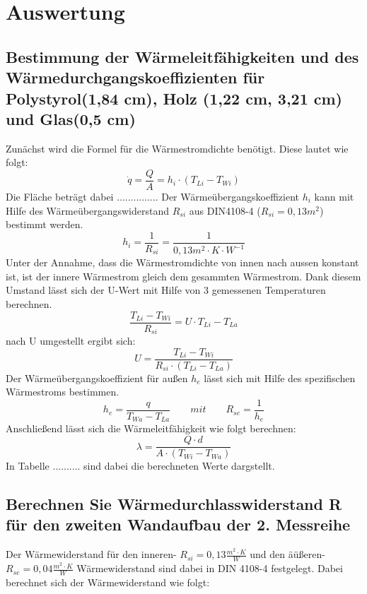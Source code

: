 \section{Auswertung}
\subsection{Bestimmung der Wärmeleitfähigkeiten und des Wärmedurchgangskoeffizienten für Polystyrol(1,84 cm), Holz (1,22 cm, 3,21 cm) und  Glas(0,5 cm)}
Zunächst wird die Formel für die Wärmestromdichte benötigt. Diese lautet wie folgt:
\begin{equation}
\dot q=\frac{ Q }{ A }=h_{ i }\cdot(T_{ Li }-T_{Wi })
  \label{eq:230514_Wärmestromdichte}
\end{equation}
Die Fläche beträgt dabei ............... Der Wärmeübergangskoeffizient $h_{i}$ kann mit Hilfe des Wärmeübergangswiderstand $R_{si}$ aus DIN4108-4 ($R_{si}=0,13 m^2$) bestimmt werden.
\begin{equation}
h_{i}=\frac{ 1 }{ R_{ si } }=\frac{ 1 }{ 0,13m^2\cdot K \cdot W^{-1} }
  \label{eq:230514_Wärmeübergangskoeffizient}
\end{equation}
Unter der Annahme, dass die Wärmestromdichte von innen nach aussen konstant ist, ist der innere Wärmestrom gleich dem gesammten Wärmestrom. Dank diesem Umstand lässt sich der U-Wert mit Hilfe von 3 gemessenen Temperaturen berechnen.
\begin{equation}
\frac{ T_{Li} - T_{Wi}}{ R_{ si } }=U \cdot T_{Li} - T_{La}
  \label{eq:230514_u1}
\end{equation}
nach U umgestellt ergibt sich: 
\begin{equation}
U = \frac{ T_{Li} - T_{Wi}}{ R_{ si } \cdot  (T_{Li} - T_{La})}
  \label{eq:230514_u2}
\end{equation}
Der Wärmeübergangskoeffizient für außen $h_{e}$ lässt sich mit Hilfe des spezifischen Wärmestroms bestimmen. 
\begin{equation}
h_{e}=\frac{ q }{ T_{Wa} - T_{La} }   \qquad  mit     \qquad       R_{se}=\frac{ 1 }{ h_{e} }
  \label{eq:230514_h_e}
\end{equation}
Anschließend lässt sich die Wärmeleitfähigkeit wie folgt berechnen:
\begin{equation}
\lambda=\frac{ Q \cdot d }{ A \cdot ( T_{Wi} - T_{Wa} )}
  \label{eq:230514_lamda}
\end{equation}
In Tabelle ..........  sind dabei die berechneten Werte dargstellt.
\subsection{Berechnen Sie Wärmedurchlasswiderstand R für den zweiten Wandaufbau der 2. Messreihe}
Der Wärmewiderstand für den inneren- $R_{si}=0,13\frac{ m^2 \cdot K }{W} $ und den äüßeren- $R_{se}=0,04 \frac{ m^2 \cdot K }{W}$ Wärmewiderstand sind dabei in DIN 4108-4 festgelegt. Dabei berechnet sich der Wärmewiderstand wie folgt: